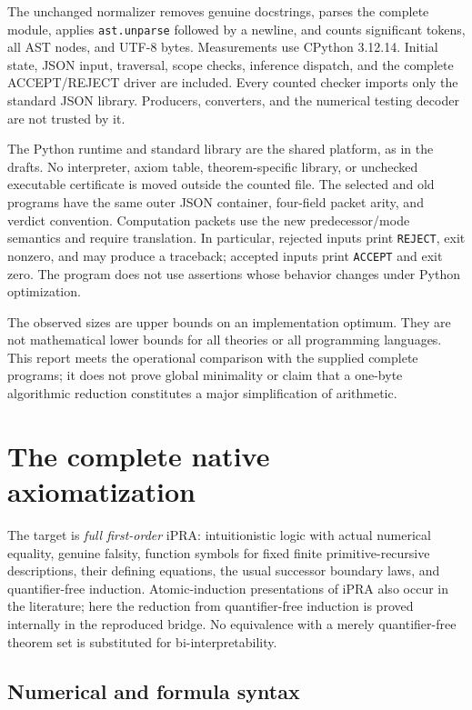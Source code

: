 \documentclass[11pt,letterpaper]{article}
\theoremstyle{definition}\newtheorem{definition}[theorem]{Definition}
\theoremstyle{remark}\newtheorem{remark}[theorem]{Remark}
\begin{document}
The unchanged normalizer removes genuine docstrings, parses the complete
module, applies \texttt{ast.unparse} followed by a newline, and counts
significant tokens, all AST nodes, and UTF-8 bytes. Measurements use
CPython 3.12.14. Initial state, JSON input, traversal, scope checks,
inference dispatch, and the complete ACCEPT/REJECT driver are included.
Every counted checker imports only the standard JSON library. Producers,
converters, and the numerical testing decoder are not trusted by it.

The Python runtime and standard library are the shared platform, as in
the drafts. No interpreter, axiom table, theorem-specific library, or
unchecked executable certificate is moved outside the counted file.
The selected and old programs have the same outer JSON container,
four-field packet arity, and verdict convention. Computation packets use
the new predecessor/mode semantics and require translation.
In particular, rejected inputs print \texttt{REJECT}, exit nonzero, and
may produce a traceback; accepted inputs print \texttt{ACCEPT} and exit
zero. The program does not use assertions whose behavior changes under
Python optimization.

The observed sizes are upper bounds on an implementation optimum. They
are not mathematical lower bounds for all theories or all programming
languages. This report meets the operational comparison with the supplied
complete programs; it does not prove global minimality or claim that a
one-byte algorithmic reduction constitutes a major simplification of
arithmetic.

\section{The complete native axiomatization}
\label{sec:native}

The target is \emph{full first-order} iPRA: intuitionistic logic with actual
numerical equality, genuine falsity, function symbols for fixed finite
primitive-recursive descriptions, their defining equations, the usual
successor boundary laws, and quantifier-free induction. Atomic-induction
presentations of iPRA also occur in the literature\cite{salehi}; here the
reduction from quantifier-free induction is proved internally in the
reproduced bridge. No equivalence with a merely quantifier-free theorem
set is substituted for bi-interpretability.

\subsection{Numerical and formula syntax}
\end{document}
